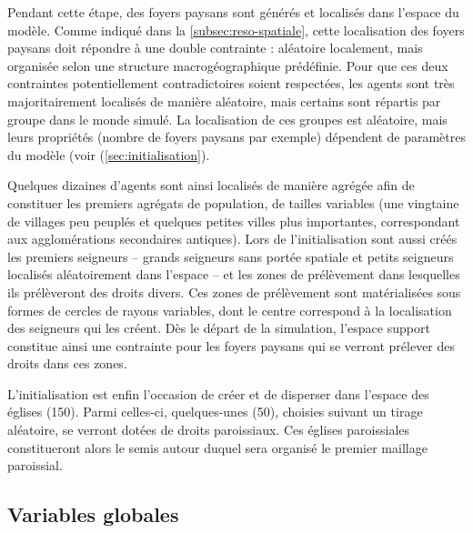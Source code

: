 \begin{tcolorbox}[breakable,left=0pt,right=0pt,top=0pt,bottom=0pt,
	colback=gray!15,colframe=gray!15,width=\dimexpr\textwidth\relax, 
	enlarge left by=0mm, boxsep=5pt,arc=0pt,outer arc=0pt]
Pendant cette étape, des foyers paysans sont générés et localisés dans l'espace du modèle.
Comme indiqué dans la \cref{subsec:reso-spatiale}, cette localisation des foyers paysans doit répondre à une double contrainte : aléatoire localement, mais organisée selon une structure macrogéographique prédéfinie.
Pour que ces deux contraintes potentiellement contradictoires soient respectées, les agents sont très majoritairement localisés de manière aléatoire, mais certains sont répartis \og par groupe\fg{} dans le monde simulé.
La localisation de ces groupes est aléatoire, mais leurs propriétés (nombre de foyers paysans par exemple) dépendent de paramètres du modèle (voir (\cref{sec:initialisation}).

\medskip
Quelques dizaines d'agents sont ainsi localisés de manière agrégée afin de constituer les premiers agrégats de population, de tailles variables (une vingtaine de villages peu peuplés et quelques petites villes plus importantes, correspondant aux agglomérations secondaires antiques).
Lors de l'initialisation sont aussi créés les premiers seigneurs -- grands seigneurs sans portée spatiale et petits seigneurs localisés aléatoirement dans l'espace -- et les zones de prélèvement dans lesquelles ils prélèveront des droits divers.
Ces zones de prélèvement sont matérialisées sous formes de cercles de rayons variables, dont le centre correspond à la localisation des seigneurs qui les créent.
Dès le départ de la simulation, l'espace support constitue ainsi une contrainte pour les foyers paysans qui se verront prélever des droits dans ces zones.

L'initialisation est enfin l'occasion de créer et de disperser dans l'espace des églises (150).
Parmi celles-ci, quelques-unes (50), choisies suivant un tirage aléatoire, se verront dotées de droits paroissiaux.
Ces églises paroissiales constitueront alors le semis autour duquel sera organisé le premier maillage paroissial.
\end{tcolorbox}

\subsection{Variables globales \label{meca-variables}}


